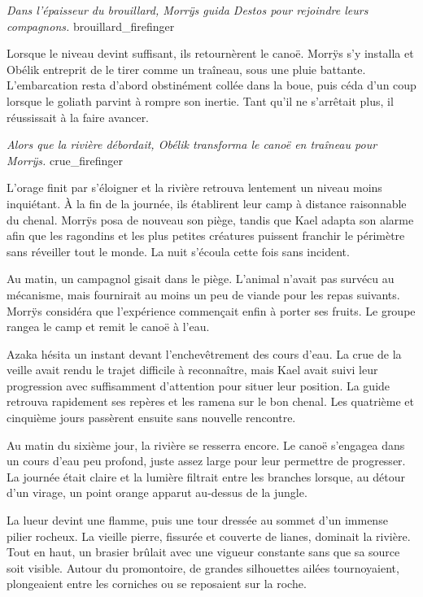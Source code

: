 {\textit{Dans l'épaisseur du brouillard, Morrÿs guida Destos pour rejoindre leurs compagnons.}}
{brouillard_firefinger}

Lorsque le niveau devint suffisant, ils retournèrent le canoë. Morrÿs s'y installa et Obélik entreprit de le tirer comme un traîneau, sous une pluie battante. L'embarcation resta d'abord obstinément collée dans la boue, puis céda d'un coup lorsque le goliath parvint à rompre son inertie. Tant qu'il ne s'arrêtait plus, il réussissait à la faire avancer.

{\textit{Alors que la rivière débordait, Obélik transforma le canoë en traîneau pour Morrÿs.}}
{crue_firefinger}

L'orage finit par s'éloigner et la rivière retrouva lentement un niveau moins inquiétant. À la fin de la journée, ils établirent leur camp à distance raisonnable du chenal. Morrÿs posa de nouveau son piège, tandis que Kael adapta son alarme afin que les ragondins et les plus petites créatures puissent franchir le périmètre sans réveiller tout le monde. La nuit s'écoula cette fois sans incident.

Au matin, un campagnol gisait dans le piège. L'animal n'avait pas survécu au mécanisme, mais fournirait au moins un peu de viande pour les repas suivants. Morrÿs considéra que l'expérience commençait enfin à porter ses fruits. Le groupe rangea le camp et remit le canoë à l'eau.

Azaka hésita un instant devant l'enchevêtrement des cours d'eau. La crue de la veille avait rendu le trajet difficile à reconnaître, mais Kael avait suivi leur progression avec suffisamment d'attention pour situer leur position. La guide retrouva rapidement ses repères et les ramena sur le bon chenal. Les quatrième et cinquième jours passèrent ensuite sans nouvelle rencontre.

\scenebreak

Au matin du sixième jour, la rivière se resserra encore. Le canoë s'engagea dans un cours d'eau peu profond, juste assez large pour leur permettre de progresser. La journée était claire et la lumière filtrait entre les branches lorsque, au détour d'un virage, un point orange apparut au-dessus de la jungle.

La lueur devint une flamme, puis une tour dressée au sommet d'un immense pilier rocheux. La vieille pierre, fissurée et couverte de lianes, dominait la rivière. Tout en haut, un brasier brûlait avec une vigueur constante sans que sa source soit visible. Autour du promontoire, de grandes silhouettes ailées tournoyaient, plongeaient entre les corniches ou se reposaient sur la roche.

